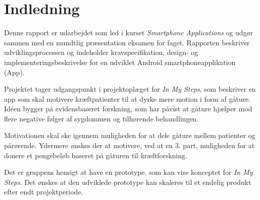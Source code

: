 \thispagestyle{fancy}
\chapter{Indledning}
\label{chp:indledning}

Denne rapport er udarbejdet som led i kurset \emph{Smartphone Applications} og udgør sammen med en mundtlig præsentation eksamen for faget. Rapporten beskriver udviklingsprocessen og indeholder kravspecifikation, design- og implementeringsbeskrivelse for en udviklet Android smartphoneapplikation (App).

Projektet tager udgangspunkt i projektoplæget for \emph{In My Steps}, som beskriver en app som skal motivere kræftpatienter til at dyrke mere motion i form af gåture. Idéen bygger på evidensbaseret forskning, som har påvist at gåture hjælper mod flere negative følger af sygdommen og tilhørende behandlingen. 

Motivationen skal ske igennem muligheden for at dele gåture mellem patienter og pårørende. Ydermere ønskes der at motivere, ved at en 3. part, muligheden for at donere et pengebeløb baseret på gåturen til kræftforskning.

Det er gruppens hensigt at have en prototype, som kan vise konceptet for \emph{In My Steps}. Det ønskes at den udviklede prototype kan skaleres til et endelig produkt efter endt projektperiode.

